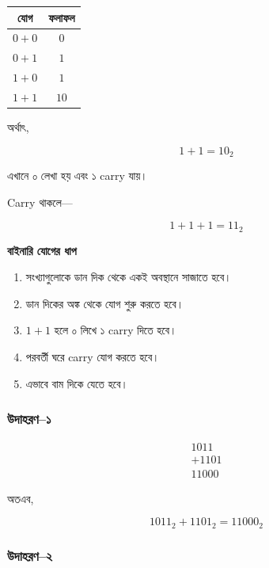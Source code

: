 \begin{center}
\begin{tabular}{|c|c|}
\hline
\rowcolor{ICTLightBlue}
\textbf{যোগ} & \textbf{ফলাফল} \\
\hline
$0+0$ & $0$ \\
\hline
$0+1$ & $1$ \\
\hline
$1+0$ & $1$ \\
\hline
$1+1$ & $10$ \\
\hline
\end{tabular}
\end{center}

অর্থাৎ,

\[
1+1=10_2
\]

এখানে ০ লেখা হয় এবং ১
\textenglish{carry} যায়।

\textenglish{Carry} থাকলে—

\[
1+1+1=11_2
\]

\par\begingroup

\textbf{বাইনারি যোগের ধাপ}

\begin{enumerate}
    \item সংখ্যাগুলোকে ডান দিক থেকে একই অবস্থানে সাজাতে হবে।
    \item ডান দিকের অঙ্ক থেকে যোগ শুরু করতে হবে।
    \item $1+1$ হলে ০ লিখে ১ \textenglish{carry} দিতে হবে।
    \item পরবর্তী ঘরে \textenglish{carry} যোগ করতে হবে।
    \item এভাবে বাম দিকে যেতে হবে।
\end{enumerate}
\par\endgroup


\subsubsection*{উদাহরণ--১}

\[
\begin{array}{r}
1011\\
+1101\\
\hline
11000
\end{array}
\]

অতএব,

\[
\boxed{1011_2+1101_2=11000_2}
\]

\subsubsection*{উদাহরণ--২}

